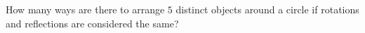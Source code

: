 How many ways are there to arrange $5$ distinct objects around a circle if rotations and reflections are considered the same?
